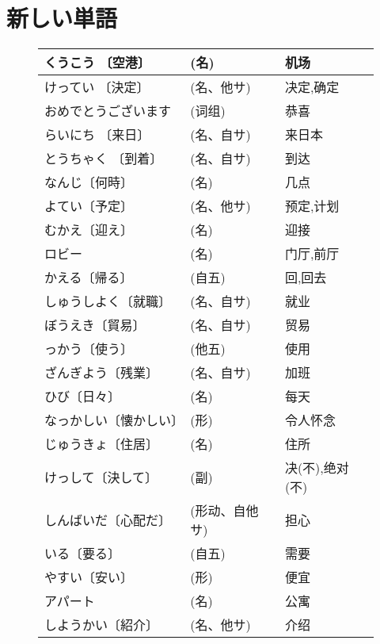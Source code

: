 
\usepackage{../../lectures_preamble}


    \section{新しい単語}
    \begin{figure}[htbp]
        \centering
        \begin{tabular}{l|l|l}
            くうこう 〔空港〕 &  (名) & 机场\\\hline
            けってい 〔決定〕 &  (名、他サ) & 决定,确定\\\hline
            おめでとうございます & (词组) & 恭喜\\\hline
            らいにち 〔来日〕 & (名、自サ) & 来日本\\\hline
            とうちゃく 〔到着〕 &  (名、自サ) & 到达\\\hline
            なんじ〔何時〕 & (名) & 几点\\\hline
            よてい〔予定〕 &  (名、他サ) & 预定,计划\\\hline
            むかえ〔迎え〕 & (名) & 迎接\\\hline
            ロビー & (名) & 门厅,前厅\\\hline
            かえる〔帰る〕 &  (自五) & 回,回去\\\hline
            しゅうしよく〔就職〕 & (名、自サ) & 就业\\\hline
            ぼうえき〔貿易〕 & (名、自サ) & 贸易\\\hline
            っかう〔使う〕 & (他五) & 使用\\\hline
            ざんぎよう〔残業〕 & (名、自サ) & 加班\\\hline
            ひび〔日々〕 & (名) & 每天\\\hline
            なっかしい〔懐かしい〕 & (形) & 令人怀念\\\hline
            じゅうきょ〔住居〕 & (名) & 住所\\\hline
            けっして〔決して〕 & (副) & 决(不),绝对(不)\\\hline
            しんばいだ〔心配だ〕 & (形动、自他サ) & 担心\\\hline
            いる〔要る〕 & (自五) & 需要\\\hline
            やすい〔安い〕 & (形) & 便宜\\\hline
            アパート & (名) & 公寓\\\hline
            しようかい〔紹介〕 & (名、他サ) & 介绍\\\hline

\end{tabular}
\end{figure}
